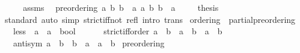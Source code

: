 \begin{isabellebody}
%
\isadelimproof
%
\endisadelimproof
%
\isatagproof
{}\isamarkupfalse%
\ {\isacharminus}{\kern0pt}\isanewline
\ \ \isamarkupfalse%
\ assms\ \isamarkupfalse%
\ preordering\ {\isacartoucheopen}{\isasymlambda}a\ b{\isachardot}{\kern0pt}\ b\ \isactrlbold {\isasymle}\ a{\isacartoucheclose}\ {\isacartoucheopen}{\isasymlambda}a\ b{\isachardot}{\kern0pt}\ b\ \isactrlbold {\isacharless}{\kern0pt}\ a{\isacartoucheclose}\ \isacommand{{\isachardot}{\kern0pt}}\isamarkupfalse%
\isanewline
\ \ \isamarkupfalse%
\ {\isacharquery}{\kern0pt}thesis\isanewline
\ \ \ \ \isamarkupfalse%
\ standard\ {\isacharparenleft}{\kern0pt}auto\ simp{\isacharcolon}{\kern0pt}\ strict{\isacharunderscore}{\kern0pt}iff{\isacharunderscore}{\kern0pt}not\ refl\ intro{\isacharcolon}{\kern0pt}\ trans{\isacharparenright}{\kern0pt}\isanewline
{}\isamarkupfalse%
%
\endisatagproof
{\isafoldproof}%
%
\isadelimproof
\isanewline
%
\endisadelimproof
\isanewline
{}\isamarkupfalse%
\ ordering\ {\isacharequal}{\kern0pt}\ partial{\isacharunderscore}{\kern0pt}preordering\ {\isacharplus}{\kern0pt}\isanewline
\ \ \ less\ {\isacharcolon}{\kern0pt}{\isacharcolon}{\kern0pt}\ {\isacartoucheopen}{\isacharprime}{\kern0pt}a\ {\isasymRightarrow}\ {\isacharprime}{\kern0pt}a\ {\isasymRightarrow}\ bool{\isacartoucheclose}\ {\isacharparenleft}{\kern0pt}\ {\isacartoucheopen}\isactrlbold {\isacharless}{\kern0pt}{\isacartoucheclose}\ {}{}{\isacharparenright}{\kern0pt}\isanewline
\ \ \ strict{\isacharunderscore}{\kern0pt}iff{\isacharunderscore}{\kern0pt}order{\isacharcolon}{\kern0pt}\ {\isacartoucheopen}a\ \isactrlbold {\isacharless}{\kern0pt}\ b\ {\isasymlongleftrightarrow}\ a\ \isactrlbold {\isasymle}\ b\ {\isasymand}\ a\ {\isasymnoteq}\ b{\isacartoucheclose}\isanewline
\ \ \ antisym{\isacharcolon}{\kern0pt}\ {\isacartoucheopen}a\ \isactrlbold {\isasymle}\ b\ {\isasymLongrightarrow}\ b\ \isactrlbold {\isasymle}\ a\ {\isasymLongrightarrow}\ a\ {\isacharequal}{\kern0pt}\ b{\isacartoucheclose}\isanewline
{}\isanewline
\isanewline
{}\isamarkupfalse%
\ preordering\ {\isacartoucheopen}{\isacharparenleft}{\kern0pt}\isactrlbold {\isasymle}{\isacharparenright}{\kern0pt}{\isacartoucheclose}\ {\isacartoucheopen}{\isacharparenleft}{\kern0pt}\isactrlbold {\isacharless}{\kern0pt}{\isacharparenright}{\kern0pt}{\isacartoucheclose}\isanewline
%
\isadelimproof
%
\endisadelimproof
%
\isatagproof

\end{isabellebody}
